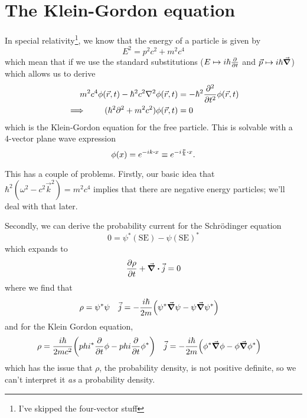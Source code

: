 \documentclass[]{revision-notes}
\begin{document}
\section{The Klein-Gordon equation}
In special relativity\footnote{I've skipped the four-vector stuff}, we know that the energy of a particle is given by
\[ E^2 = p^2 c^2 + m^2 c^4 \]
which mean that if we use the standard substitutions (\(E \mapsto i\hbar \pdv{t}\) and \(\vec{p}\mapsto i\hbar\grad\)) which allows us to derive
\begin{align*}
  m^2 c^4 \phi(\vec{r}, t) - \hbar^2 c^2 \laplacian \phi(\vec{r}, t) &= -\hbar^2 \pdv[2]{t}\phi(\vec{r}, t)\\
  \implies \qquad (\hbar^2\partial^2 + m^2 c^2)\phi(\vec{r}, t) &= 0
\end{align*}
which is the Klein-Gordon equation for the free particle. This is solvable with a 4-vector plane wave expression \[\phi(x) = e^{-ik\vdot x} \equiv e^{-i\frac{p}{\hbar}\vdot x}.\]

This has a couple of problems.
Firstly, our basic idea that \(\hbar^2( \omega^2 - c^2 \vec{k}^2 ) = m^2 c^4\) implies that there are negative energy particles; we'll deal with that later.

Secondly, we can derive the probability current for the Schr\"odinger equation \[0 = \psi^\ast (\text{SE})  - \psi (\text{SE})^\ast \] which expands to
\[\pdv{\rho}{t} + \div\vec{j} = 0\]
where we find that
\begin{align*}
  \rho &= \psi^\ast \psi & \vec{j} &= -\frac{i\hbar}{2m}\qty(\psi^\ast \grad\psi - \psi \grad\psi^\ast)
\end{align*}
and for the Klein Gordon equation,
\begin{align*}
  \rho &= \frac{i\hbar}{2mc^2}\qty(phi^\ast \pdv{t}\phi - phi \pdv{t}\phi^\ast) & \vec{j} &= -\frac{i\hbar}{2m}\qty(\phi^\ast \grad\phi - \phi \grad\phi^\ast)
\end{align*}
which has the issue that \(\rho\), the probability density, is not positive definite, so we can't interpret it \emph{as} a probability density.
\end{document}
